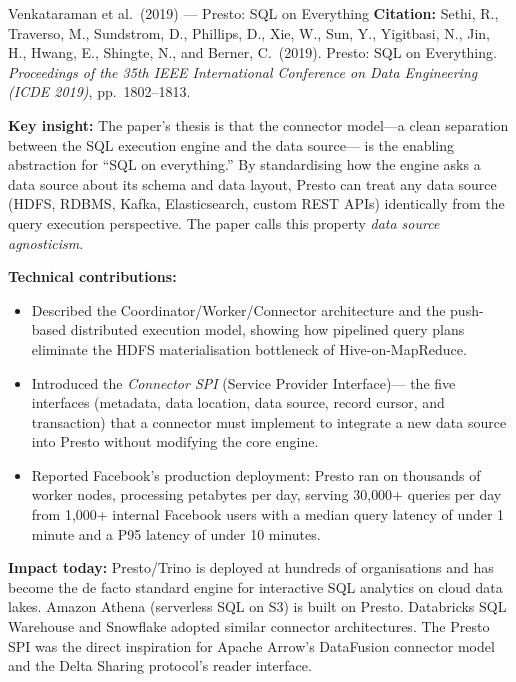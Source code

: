 \begin{researchspotlight}{Venkataraman et al.\ (2019) --- Presto: SQL on Everything}
\textbf{Citation:} Sethi, R., Traverso, M., Sundstrom, D., Phillips, D.,
Xie, W., Sun, Y., Yigitbasi, N., Jin, H., Hwang, E., Shingte, N., and
Berner, C.\ (2019). Presto: SQL on Everything. \textit{Proceedings of the
35th IEEE International Conference on Data Engineering (ICDE 2019)},
pp.\ 1802--1813. \parencite{Presto2019}

\smallskip\noindent
\textbf{Key insight:} The paper's thesis is that the connector model---a
clean separation between the SQL execution engine and the data source---
is the enabling abstraction for ``SQL on everything.'' By standardising
how the engine asks a data source about its schema and data layout, Presto
can treat any data source (HDFS, RDBMS, Kafka, Elasticsearch, custom
REST APIs) identically from the query execution perspective. The paper
calls this property \emph{data source agnosticism}.

\smallskip\noindent
\textbf{Technical contributions:}
\begin{itemize}
  \item Described the Coordinator/Worker/Connector architecture and
        the push-based distributed execution model, showing how
        pipelined query plans eliminate the HDFS materialisation
        bottleneck of Hive-on-MapReduce.
  \item Introduced the \emph{Connector SPI} (Service Provider Interface)---
        the five interfaces (metadata, data location, data source, record
        cursor, and transaction) that a connector must implement to integrate
        a new data source into Presto without modifying the core engine.
  \item Reported Facebook's production deployment: Presto ran on thousands
        of worker nodes, processing petabytes per day, serving 30{,}000+
        queries per day from 1{,}000+ internal Facebook users with a
        median query latency of under 1 minute and a P95 latency of under
        10 minutes.
\end{itemize}

\smallskip\noindent
\textbf{Impact today:} Presto/Trino is deployed at hundreds of organisations
and has become the de facto standard engine for interactive SQL analytics
on cloud data lakes. Amazon Athena (serverless SQL on S3) is built on
Presto. Databricks SQL Warehouse and Snowflake adopted similar connector
architectures. The Presto SPI was the direct inspiration for Apache
Arrow's DataFusion connector model and the Delta Sharing protocol's
reader interface.
\end{researchspotlight}

